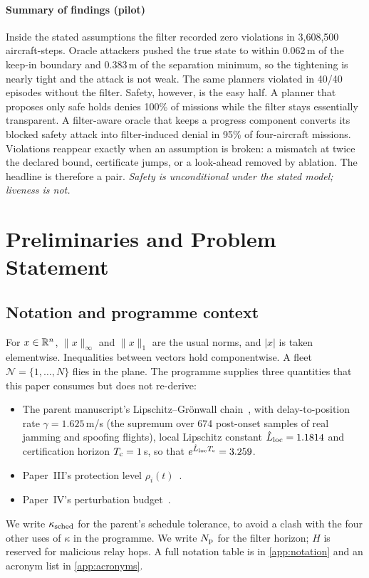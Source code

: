 \paragraph{Summary of findings (pilot)} Inside the stated assumptions the
filter recorded zero violations in 3,608,500 aircraft-steps. Oracle
attackers pushed the true state to within 0.062\,m of the keep-in boundary
and 0.383\,m of the separation minimum, so the tightening is nearly tight
and the attack is not weak. The same planners violated in 40/40 episodes
without the filter. Safety, however, is the easy half. A planner that
proposes only safe holds denies 100\% of missions while the filter stays
essentially transparent. A filter-aware oracle that keeps a progress
component converts its blocked safety attack into filter-induced denial in
95\% of four-aircraft missions. Violations reappear exactly when an
assumption is broken: a mismatch at twice the declared bound, certificate
jumps, or a look-ahead removed by ablation. The headline is therefore a
pair. \emph{Safety is unconditional under the stated model; liveness is
not.}

\section{Preliminaries and Problem Statement}\label{sec:prelim}
\subsection{Notation and programme context}
For $x\in\mathbb{R}^n$, $\|x\|_\infty$ and $\|x\|_1$ are the usual norms, and $|x|$
is taken elementwise. Inequalities between vectors hold componentwise. A
fleet $\mathcal N=\{1,\dots,N\}$ flies in the plane. The programme supplies
three quantities that this paper consumes but does not re-derive:
\begin{itemize}
\item The parent manuscript's Lipschitz--Gr\"onwall
  chain~\cite{parentpaper}, with delay-to-position rate
  $\gamma=1.625$\,m/s (the supremum over 674 post-onset samples of real
  jamming and spoofing flights), local Lipschitz constant $\hat L_{\mathrm{loc}}=1.1814$ and
  certification horizon $T_{\mathrm{c}}=1$\,s, so that $e^{\hat L_{\mathrm{loc}}T_{\mathrm{c}}}=3.259$.
\item Paper~III's protection level $\rho_i(t)$~\cite{paperIII}.
\item Paper~IV's perturbation budget~\cite{paperIV}.
\end{itemize}
We write $\kappa_{\mathrm{sched}}$ for the parent's schedule tolerance, to avoid a clash with
the four other uses of $\kappa$ in the programme. We write $N_{\mathrm{p}}$ for the
filter horizon; $H$ is reserved for malicious relay hops. A full notation
table is in \cref{app:notation} and an acronym list in \cref{app:acronyms}.

